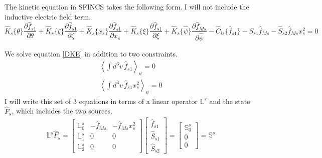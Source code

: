 \documentclass[11pt]{amsart}
\newcommand{\partder}[2]{\dfrac{\partial #1}{\partial #2}} %
\begin{document}
The kinetic equation in SFINCS takes the following form. I will not include the inductive electric field term. 
\begin{dmath}
\hat{K}_s\{\theta\} \partder{\hat{f}_{s1}}{\theta} + \hat{K}_s\{\zeta\} \partder{\hat{f}_{s1}}{\zeta} + \hat{K}_s \{x_s\} \partder{\hat{f}_{s1}}{x_s} + \hat{K}_s \{\xi\} \partder{\hat{f}_{s1}}{\xi} + \hat{K}_s\{\hat{\psi}\} \partder{\hat{f}_{Ms}}{\hat{\psi}} - \hat{C}_{ls} \{ \hat{f}_{s1} \} - \hat{S}_{s1} \hat{f}_{Ms} - \hat{S}_{s2} \hat{f}_{Ms} x_s^2  = 0
\label{DKE}
\end{dmath}
\iffalse
Here things are normalized in the following way. 
\begin{gather}
\hat{K}_s \{ ... \} = \frac{\bar{R}}{\bar{v}} = K_s \{ ...\} \\
\hat{C}_s \{ \hat{f}_s \} = \frac{1}{\bar{\nu}} C_s \{ \hat{f}_s \} \\
\hat{S}_{sj} = \frac{\bar{R}}{\bar{v}} S_{sj} \\
f_s = \frac{\bar{n}}{\bar{v}^3} \hat{f}_s \\
\hat{\psi} = \frac{\psi}{\bar{B} \bar{R}^2}
\end{gather}
\fi
We solve equation \ref{DKE} in addition to two constraints.
\begin{gather}
\left\langle \int d^3 v \, \hat{f}_{s1} \right\rangle_{\psi} = 0 \\
\left\langle \int d^3 v \, \hat{f}_{s1} x_s^2 \right \rangle_{\psi} = 0 
\end{gather}
I will write this set of 3 equations in terms of a linear operator $\mathbb{L}^s$ and the state $\hat{F}_s$, which includes the two sources.
\begin{gather}
\mathbb{L}^s \hat{F}_s =
\begin{bmatrix}
\mathbb{L}_0^s & - \hat{f}_{Ms} & - \hat{f}_{Ms} x_s^2  \\
\mathbb{L}_1^s & 0 & 0 \\
\mathbb{L}_2^s & 0 & 0 
\end{bmatrix}
\begin{bmatrix}
\hat{f}_{s1} \\
\hat{S}_{s1} \\
\hat{S}_{s2}
\end{bmatrix} = \begin{bmatrix}
\mathbb{S}^s_0 \\
0 \\
0
\end{bmatrix} = \mathbb{S}^s \label{matrixEquation}
\end{gather}
\end{document}
